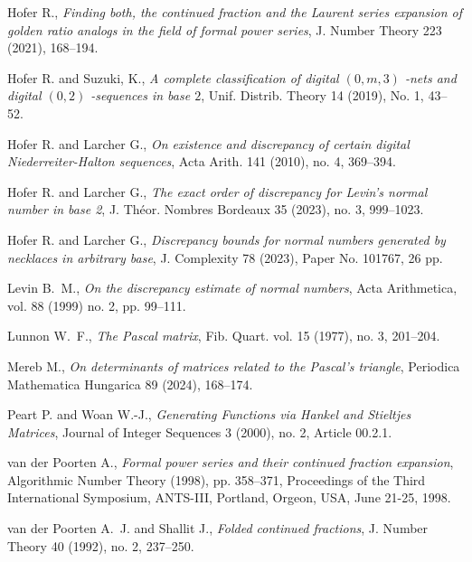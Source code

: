 \documentclass{article}
\begin{document}
\begin{thebibliography}{99}
 Hofer R., \textit{Finding both, the continued fraction and the Laurent series expansion of golden ratio analogs in the field of formal power series}, J. Number Theory 223 (2021), 168--194.

 Hofer R. and Suzuki, K., \textit{A complete classification of digital $(0,m,3)$
-nets and digital $(0,2)$
-sequences in base $2$}, Unif. Distrib. Theory 14 (2019), No. 1, 43--52.

 Hofer R. and Larcher G., \textit{On existence and discrepancy of certain digital Niederreiter-Halton sequences}, Acta Arith. 141 (2010), no. 4, 369--394.

 Hofer R. and Larcher G., \textit{The exact order of discrepancy for Levin's normal number in base 2}, J. Th\'{e}or. Nombres Bordeaux 35 (2023), no. 3, 999--1023. 

 Hofer R. and Larcher G., \textit{Discrepancy bounds for normal numbers generated by necklaces in arbitrary base}, J. Complexity 78 (2023), Paper No. 101767, 26 pp.

 Levin B.~M., \textit{On the discrepancy estimate of normal numbers}, Acta Arithmetica, vol. 88 (1999) no. 2, pp.
99--111.

 Lunnon W.~F., \textit{The Pascal matrix}, Fib. Quart. vol. 15 (1977), no. 3, 201--204. 



 Mereb M., \textit{On determinants of matrices related to the Pascal's triangle}, Periodica Mathematica Hungarica 89 (2024), 168--174. 
 

 Peart P. and Woan W.-J., \textit{Generating Functions via Hankel and Stieltjes Matrices}, Journal of Integer Sequences 3 (2000), no. 2, Article 00.2.1. 

 van der Poorten A., \textit{Formal power series and their continued fraction expansion},  Algorithmic Number Theory (1998), pp. 358--371, Proceedings of the Third International Symposium, ANTS-III, Portland, Orgeon, USA, June 21-25, 1998. 

  van der Poorten A.~J. and Shallit J., \textit{Folded continued fractions}, J. Number Theory 40 (1992), no. 2, 237--250. 

\end{thebibliography}
\end{document}
